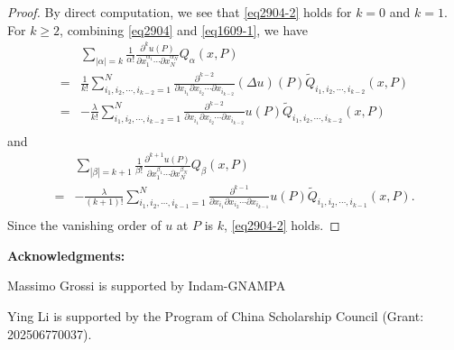 \documentclass[11pt,reqno]{article}
\numberwithin{equation}{section}
\begin{document}
                 \begin{proof}
                     By direct computation, we see that \eqref{eq2904-2} holds for $k=0$ and $k=1$. 
                     For $k\ge2$, combining \eqref{eq2904} and \eqref{eq1609-1}, we have
                     \begin{align*}
                         &\sum_{|\alpha|=k}\frac1{\alpha!}
					\frac{\partial^ku(P)}{\partial x_1^{\alpha_1}\cdots\partial x_N^{\alpha_N}}Q_\alpha(x,P)\\
                    =&\frac{1}{k!}\sum_{i_1,i_2,\cdots,i_{k-2}=1}^{N}\frac{\partial^{k-2}}{\partial x_{i_1} \partial x_{i_2}\cdots \partial x_{i_{k-2}}} (\Delta u)(P) \widetilde{Q}_{i_1,i_2,\cdots,i_{k-2}}(x,P)\\
                   =& -\frac{\lambda}{k!}\sum_{i_1,i_2,\cdots,i_{k-2}=1}^{N}\frac{\partial^{k-2}}{\partial x_{i_1} \partial x_{i_2}\cdots \partial x_{i_{k-2}}}  u(P) \widetilde{Q}_{i_1,i_2,\cdots,i_{k-2}}(x,P)\\
                     \end{align*}
                     and 
                      \begin{align*}
                         &\sum_{|\beta|=k+1}\frac1{\beta!}
					\frac{\partial^{k+1}u(P)}{\partial x_1^{\beta_1}\cdots\partial x_N^{\beta_N}}Q_\beta(x,P)\\
                   =& -\frac{\lambda}{(k+1)!}\sum_{i_1,i_2,\cdots,i_{k-1}=1}^{N}\frac{\partial^{k-1}}{\partial x_{i_1} \partial x_{i_2}\cdots \partial x_{i_{k-1}}}  u(P) \widetilde{Q}_{i_1,i_2,\cdots,i_{k-1}}(x,P).\\
                     \end{align*}
                     Since the vanishing order of $u$ at $P$ is $k$, \eqref{eq2904-2} holds.
                 \end{proof}
            
  \textbf{Acknowledgments:}
  
Massimo Grossi is supported by Indam-GNAMPA
  
 Ying Li is supported by the Program of China Scholarship Council (Grant: 202506770037).   


	
	
\end{document}
